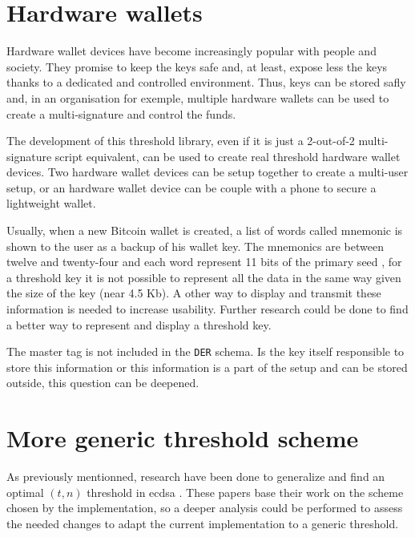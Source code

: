 \section{Hardware wallets}

Hardware wallet devices have become increasingly popular with people and society. They
promise to keep the keys safe and, at least, expose less the keys thanks to a
dedicated and controlled environment. Thus, keys can be stored safly and, in an
organisation for exemple, multiple hardware wallets can be used to create a
multi-signature and control the funds.

The development of this threshold library, even if it is just a 2-out-of-2
multi-signature script equivalent, can be used to create real threshold hardware
wallet devices. Two hardware wallet devices can be setup together to create a
multi-user setup, or an hardware wallet device can be couple with a phone to secure
a lightweight wallet.

Usually, when a new Bitcoin wallet is created, a list of words called mnemonic is
shown to the user as a backup of his wallet key. The mnemonics are between twelve
and twenty-four and each word represent 11 bits of the primary seed \cite{Mnemonic},
for a threshold key it is not possible to represent all the data in the same way
given the size of the key (near 4.5 Kb). A other way to display and transmit these
information is needed to increase usability. Further research could be done to find
a better way to represent and display a threshold key.

The master tag is not included in the \texttt{DER} schema. Is the key itself responsible
to store this information or this information is a part of the setup and can be stored
outside, this question can be deepened.

\section{More generic threshold scheme}

As previously mentionned, research have been done to generalize and find an optimal
$(t, n)$ threshold in \gls{ecdsa} \cite{10.1007/BFb0052253, 10.1007/978-3-642-27954-6_20}.
These papers base their work on the scheme chosen by the implementation, so a
deeper analysis could be performed to assess the needed changes to adapt the current
implementation to a generic threshold.

